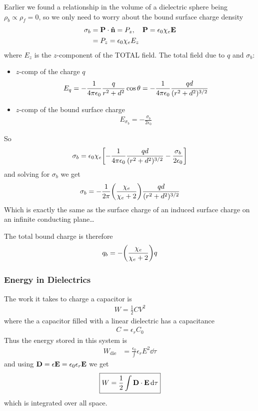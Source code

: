 \documentclass[../main.tex]{subfiles}
\begin{document}
Earlier we found a relationship in the volume of a dielectric sphere being $\rho_b \propto \rho_f = 0$,
so we only need to worry about the bound surface charge density
\begin{align*}
    \sigma_b &= \vb P \cdot \vu n = P_z, \quad \vb P = \epsilon_0 \chi_e \vb E \\
    &= P_z = \epsilon_0 \chi_e E_z
\end{align*}
where $E_z$ is the $z$-component of the TOTAL field. The total field due to $q$ and $\sigma_b$:
\begin{itemize}
    \item $z$-comp of the charge $q$
    \begin{align*}
        E_q = -\frac{1}{4\pi\epsilon_0} \frac{q}{r^2 + d^2} \cos\theta = -\frac{1}{4\pi\epsilon_0} \frac{qd}{(r^2 + d^2)^{3/2}}
    \end{align*}
    \item $z$-comp of the bound surface charge
    \begin{align*}
        E_{\sigma_b} = -\frac{\sigma_b}{2\epsilon_0} 
    \end{align*}
\end{itemize}
So
\begin{align*}
    \sigma_b = \epsilon_0 \chi_e \qt[
        -\ke \frac{qd}{(r^2 + d^2)^{3/2}} - \frac{\sigma_b}{2\epsilon_0}
    ]
\end{align*}
and solving for $\sigma_b$ we get
\begin{align*}
    \sigma_b = -\frac{1}{2\pi} \qt(\frac{\chi_e}{\chi_e + 2}) \frac{qd}{(r^2 + d^2)^{3/2}}
\end{align*}
Which is exactly the same as the surface charge of an induced surface charge on an infinite conducting plane\dots

The total bound charge is therefore
\begin{align*}
    q_b = -\qt(\frac{\chi_e}{\chi_e + 2}) q
\end{align*}

\newpage
{}

\subsubsection{Energy in Dielectrics}
The work it takes to charge a capacitor is
\begin{align*}
    W = \frac{1}{2} CV^2
\end{align*}
where the a capacitor filled with a linear dielectric has a capacitance
\begin{align*}
    C = \epsilon_r C_0
\end{align*}
Thus the energy stored in this system is
\begin{align*}
    W_\text{die} &= \frac{\epsilon_0} \int \epsilon_r E^2 \dd{\tau}
\end{align*}
and using $\vb D = \epsilon \vb E = \epsilon_0 \epsilon_r \vb E$ we get
\begin{align*}
    \boxed{
        W = \frac{1}{2} \int \vb D \cdot \vb E \dd{\tau}
    }
\end{align*}
which is integrated over all space.
\end{document}
